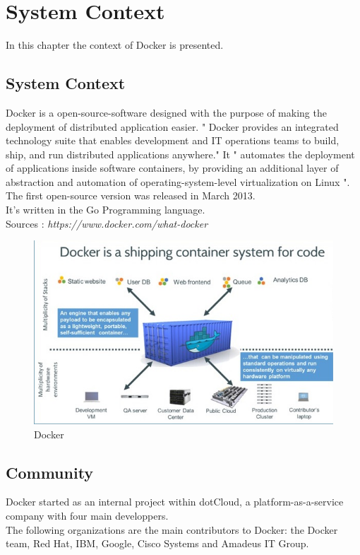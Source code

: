 \chapter{System Context}
\label{ch:context}

In this chapter the context of Docker is presented.

\section{System Context}
Docker is a open-source-software designed with the purpose of making the deployment of distributed application easier.
 " Docker provides an integrated technology suite that enables development and IT operations teams to build, ship, and run distributed applications anywhere."
It " automates the deployment of applications inside software containers, by providing an additional layer of abstraction and automation of operating-system-level virtualization on Linux ". \\
The first open-source version was released in March 2013. \\
It's written in the Go Programming language. \\

Sources : \textit{https://www.docker.com/what-docker}

\begin{figure}[H]
\centering
\includegraphics[scale=0.8]{images/docker_container.jpeg}
\caption{Docker}
\label{fig:analysis-mvc}
\end{figure}

\section{Community}
Docker started as an internal project within dotCloud, a platform-as-a-service company with four main developpers. \\
The following organizations are the main contributors to Docker: the Docker team, Red Hat, IBM, Google, Cisco Systems and Amadeus IT Group. \\